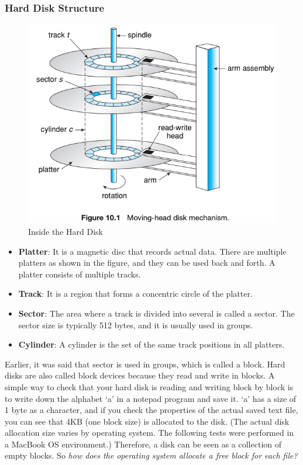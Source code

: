 \documentclass{homework}
\begin{document}
\subsubsection{Hard Disk Structure}
\begin{figure}[h]
\begin{center}
\includegraphics[scale=0.7]{38.png}    
\caption{Inside the Hard Disk}
\end{center}
\end{figure}

\begin{itemize}
    \item \textbf{Platter}: It is a magnetic disc that records actual data. There are multiple platters as shown in the figure, and they can be used back and forth. A platter consists of multiple tracks.
    \item \textbf{Track}: It is a region that forms a concentric circle of the platter.
    \item \textbf{Sector}: The area where a track is divided into several is called a sector. The sector size is typically 512 bytes, and it is usually used in groups.
    \item \textbf{Cylinder}: A cylinder is the set of the same track positions in all platters.
\end{itemize}

Earlier, it was said that sector is used in groups, which is called a block. Hard disks are also called block devices because they read and write in blocks. A simple way to check that your hard disk is reading and writing block by block is to write down the alphabet ‘a’ in a notepad program and save it. ‘a’ has a size of 1 byte as a character, and if you check the properties of the actual saved text file, you can see that 4KB (one block size) is allocated to the disk. (The actual disk allocation size varies by operating system. The following tests were performed in a MacBook OS environment.) Therefore, a disk can be seen as a collection of empty blocks. So \textit{how does the operating system allocate a free block for each file?}
\end{document}
